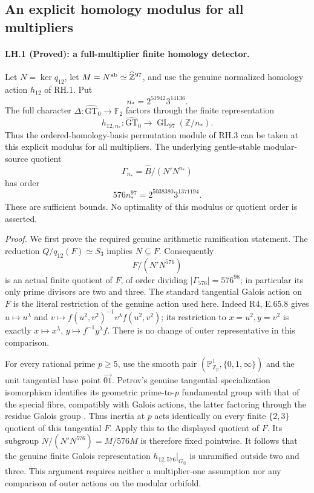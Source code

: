 \subsection{An explicit homology modulus for all multipliers}

\paragraph{LH.1 (Proved): a full-multiplier finite homology detector.}
Let $N=\ker q_{12}$, let $M=N^{\rm ab}\simeq
\widehat{\mathbb Z}^{97}$, and use the genuine normalized
homology action $h_{12}$ of RH.1. Put
\[
                  \boxed{\ n_*=2^{51942}3^{14136}.\ }
\]
The full character $\Delta:\widehat{\mathrm{GT}}_0\to\mathbb F_2$
factors through the finite representation
\[
 h_{12,n_*}:\widehat{\mathrm{GT}}_0\longrightarrow
             \operatorname{GL}_{97}(\mathbb Z/n_*).
\]
Thus the ordered-homology-basis permutation module of RH.3
can be taken at this explicit modulus for all multipliers.
The underlying gentle-stable modular-source quotient
\[
 \Gamma_{n_*}=\widehat B/(N'N^{n_*})
\]
has order
\[
       576n_*^{97}=2^{5038380}3^{1371194}.
\]
These are sufficient bounds. No optimality of this modulus
or quotient order is asserted.

\emph{Proof.}
We first prove the required genuine arithmetic ramification
statement. The reduction $Q/q_{12}(F)\simeq S_3$ implies
$N\subseteq F$. Consequently
\[
                 F/(N'N^{576})
\]
is an actual finite quotient of $F$, of order dividing
$|\Gamma_{576}|=576^{98}$; in particular its only prime
divisors are two and three. The standard tangential Galois
action on $F$ is the literal restriction of the genuine
action used here. Indeed R4, E.65.8 gives
$u\mapsto u^\lambda$ and
$v\mapsto f(u^2,v^2)^{-1}v^\lambda f(u^2,v^2)$; its
restriction to $x=u^2,y=v^2$ is exactly
$x\mapsto x^\lambda$, $y\mapsto f^{-1}y^\lambda f$.
There is no change of outer representative in this comparison.

For every rational prime $p\geq5$, use the smooth pair
$(\mathbb P^1_{\mathbb Z_p},\{0,1,\infty\})$ and the
unit tangential base point $\overrightarrow{01}$.
Petrov's genuine tangential specialization isomorphism
identifies its geometric prime-to-$p$ fundamental group with
that of the special fibre, compatibly with Galois actions,
the latter factoring through the residue Galois group
\cite[Lemma~8.7]{LiftPetrov2023}.
Thus inertia at $p$ acts identically on every finite
$\{2,3\}$ quotient of this tangential $F$. Apply this to
the displayed quotient of $F$. Its subgroup
$N/(N'N^{576})=M/576M$ is therefore fixed pointwise.
It follows that the genuine finite Galois representation
$h_{12,576}|_{G_{\mathbb Q}}$ is unramified outside two
and three. This argument requires neither a multiplier-one
assumption nor any comparison of outer actions on the
modular orbifold.

